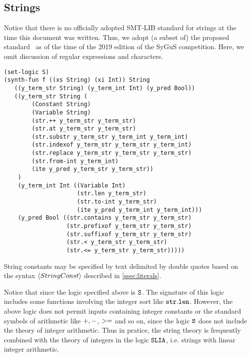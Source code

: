 \documentclass[english,a4paper,10pt]{article}
\begin{document}
\begin{appendix}
\subsection{Strings}

Notice that there is no
officially adopted SMT-LIB standard for strings at the time
this document was written.
Thus, we adopt (a subset of) the proposed standard~\cite{smtlibStrings}
as of the time of the 2019 edition of the SyGuS competition.
Here, we omit discussion of regular expressions and characters.
\begin{lstlisting}[language=SyGuS]
(set-logic S)
(synth-fun f ((xs String) (xi Int)) String
   ((y_term_str String) (y_term_int Int) (y_pred Bool))
   ((y_term_str String (
        (Constant String)
        (Variable String)
        (str.++ y_term_str y_term_str)
        (str.at y_term_str y_term_str)
        (str.substr y_term_str y_term_int y_term_int)
        (str.indexof y_term_str y_term_str y_term_int)
        (str.replace y_term_str y_term_str y_term_str)
        (str.from-int y_term_int)
        (ite y_pred y_term_str y_term_str))
    )
    (y_term_int Int ((Variable Int)
                     (str.len y_term_str)
                     (str.to-int y_term_str)
                     (ite y_pred y_term_int y_term_int)))
    (y_pred Bool ((str.contains y_term_str y_term_str)
                  (str.prefixof y_term_str y_term_str)
                  (str.suffixof y_term_str y_term_str)
                  (str.< y_term_str y_term_str)
                  (str.<= y_term_str y_term_str)))))
\end{lstlisting}
String constants may be specified by text delimited by double quotes
based on the syntax $\left\langle StringConst\right\rangle$ described in \cref{ssec:literals}.

Notice that since the logic specified above is ${\tt S}$.
The signature of this logic includes 
some functions involving the integer sort like
${\tt str.len}$.
However, the above logic does not permit inputs containing
integer constants or the standard symbols of arithmetic like 
${\tt +}, {\tt -}$, ${\tt >=}$ and so on, since the logic ${\tt S}$
does not include the theory of integer arithmetic.
Thus in pratice, 
the string theory is frequently combined with the theory of integers
in the logic ${\tt SLIA}$, i.e. strings with linear integer arithmetic.





\end{appendix}
\end{document}
